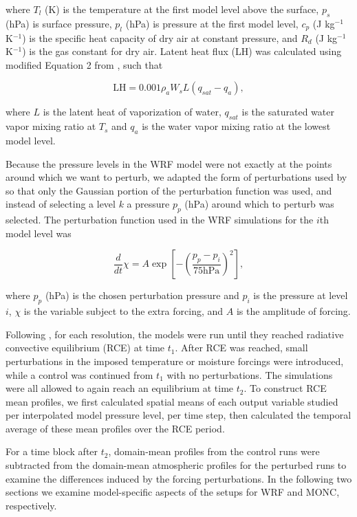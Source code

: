 \documentclass[draft]{agujournal2019}
\begin{document}
\noindent where $T_l$ (K) is the temperature at the first model level above the
surface, $p_s$ (hPa) is surface pressure, $p_l$ (hPa) is pressure at the first
model level, $c_p$ (J kg$^{-1}$ K$^{-1}$) is the specific heat capacity of dry
air at constant pressure, and $R_d$ (J kg$^{-1}$ K$^{-1}$) is the gas constant
for dry air. Latent heat flux (LH) was calculated using modified Equation 2 from
, such that

\begin{equation}
\textrm{LH} = 0.001 \rho_a W_s L (q_{sat} - q_a),
\label{eq:LH}
\end{equation}

\noindent where $L$ is the latent heat of vaporization of water, $q_{sat}$ is
the saturated water vapor mixing ratio at $T_s$ and $q_a$ is the water vapor
mixing ratio at the lowest model level. 

Because the pressure levels in the WRF model were not exactly at the points
around which we want to perturb, we adapted the form of perturbations used by
 so that only the Gaussian portion of the perturbation
function was used, and instead of selecting a level $k$ a pressure $p_p$ (hPa)
around which to perturb was selected. The perturbation function used in the WRF
simulations for the $i$th model level was

\begin{equation}
\frac{d}{dt} \chi = A \exp\left[ - \left( \frac{p_p - p_i}{75 \textrm{hPa}}\right)^2 \right],
\end{equation}

\noindent where $p_p$ (hPa) is the chosen perturbation pressure and $p_i$ is the
pressure at level $i$, $\chi$ is the variable subject to the extra forcing, and
$A$ is the amplitude of forcing. 

Following , for each resolution, the models were run until
they reached radiative convective equilibrium (RCE) at time $t_1$. After RCE was
reached, small perturbations in the imposed temperature or moisture forcings
were introduced, while a control was continued from $t_1$ with no perturbations.
The simulations were all allowed to again reach an equilibrium at time $t_2$. To
construct RCE mean profiles, we first calculated spatial means of each output
variable studied per interpolated model pressure level, per time step, then
calculated the temporal average of these mean profiles over the RCE period.

For a time block after $t_2$, domain-mean profiles from the control runs were
subtracted from the domain-mean atmospheric profiles for the perturbed runs to
examine the differences induced by the forcing perturbations. In the following
two sections we examine model-specific aspects of the setups for WRF and MONC,
respectively.
\end{document}
